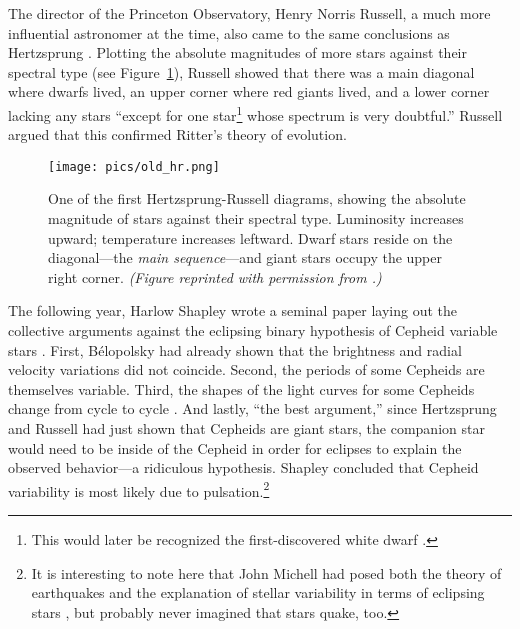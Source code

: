 The director of the Princeton Observatory, Henry Norris Russell, a much more influential astronomer at the time, also came to the same conclusions as Hertzsprung \citep[e.g.,][]{1913Obs....36..324R, 1913Sci....37..651R}. 
Plotting the absolute magnitudes of more stars against their spectral type (see Figure~\ref{fig:HRD}), Russell showed that there was a main diagonal where dwarfs lived, an upper corner where red giants lived, and a lower corner lacking any stars ``except for one star\footnote{ This would later be recognized the first-discovered white dwarf \citep[e.g.,][]{1958whdw.book.....S}.} whose spectrum is very doubtful.'' 
Russell argued that this confirmed Ritter's theory of evolution. 

\begin{figure}
    \centering
    \texttt{[image: pics/old\_hr.png]}
    \caption[Historical Hertzsprung-Russell Diagram]{One of the first Hertzsprung-Russell diagrams, showing the absolute magnitude of stars against their spectral type. 
        Luminosity increases upward; temperature increases leftward. 
        Dwarf stars reside on the diagonal---the \emph{main sequence}---and giant stars occupy the upper right corner. 
        \emph{(Figure reprinted with permission from \citealt{1914Natur..93..252R}.)} 
        \label{fig:HRD}}
\end{figure}



The following year, Harlow Shapley wrote a seminal paper laying out the collective arguments against the eclipsing binary hypothesis of Cepheid variable stars \citep{1914ApJ....40..448S}. 
First, B{\'e}lopolsky had already shown that the brightness and radial velocity variations did not coincide. 
Second, the periods of some Cepheids are themselves variable. %
Third, the shapes of the light curves for some Cepheids change from cycle to cycle \citep[e.g.,][]{1905ApJ....22..274C}. 
And lastly, ``the best argument,'' since Hertzsprung and Russell had just shown that Cepheids are giant stars, the companion star would need to be inside of the Cepheid in order for eclipses to explain the observed behavior---a ridiculous hypothesis. 
Shapley concluded that Cepheid variability is most likely due to pulsation.\footnote{ It is interesting to note here that John Michell had posed both the theory of earthquakes \citep{Michell01011759} and the explanation of stellar variability in terms of eclipsing stars \citep{michell1767inquiry}, but probably never imagined that stars quake, too.}  

